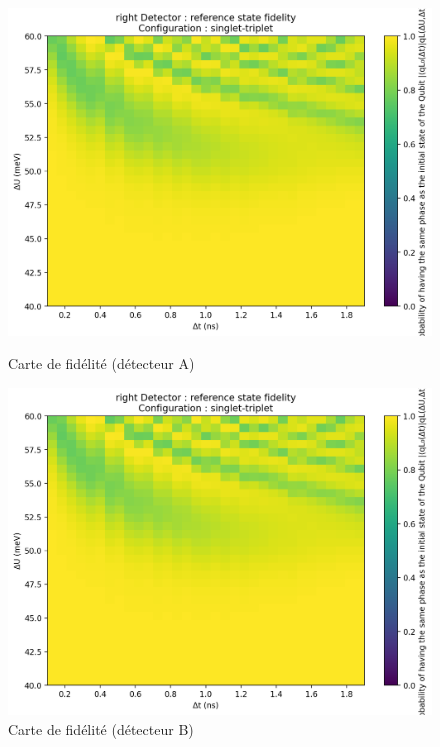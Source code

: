 \documentclass{article}
\begin{document}
\begin{figure}[H]
  \centering
  \begin{minipage}[c]{0.48\textwidth}
    \centering
    \includegraphics[width=\textwidth]{p_detector_overlap_map_33x33_20250822-003725_faible.png}
    \caption{Carte de fidélité (détecteur A)}
    \label{fig:fidelity_map_a}
  \end{minipage}\hfill
  \begin{minipage}[c]{0.48\textwidth}
    \centering
    \includegraphics[width=\textwidth]{p_detector_overlap_map_33x33_20250822-003725_faible.png}
    \caption{Carte de fidélité (détecteur B)}
    \label{fig:fidelity_map_b}
  \end{minipage}
\end{figure}
\end{document}
